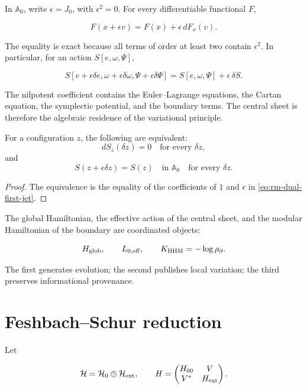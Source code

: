 In \(\mathbb A_0\), write \(\epsilon=J_0\), with \(\epsilon^2=0\). For
every differentiable functional \(F\),

\begin{equation}
\boxed{F(x+\epsilon v)=F(x)+\epsilon\,dF_x(v).}
\label{eq:rm-dual-first-jet}
\end{equation}

The equality is exact because all terms of order at least two
contain \(\epsilon^2\). In particular, for an action
\(S[e,\omega,\Psi]\),

\begin{equation}
S[e+\epsilon\delta e,\omega+\epsilon\delta\omega,
  \Psi+\epsilon\delta\Psi]
=S[e,\omega,\Psi]+\epsilon\,\delta S.
\label{eq:rm-action-first-jet}
\end{equation}

The nilpotent coefficient contains the Euler--Lagrange equations, the
Cartan equation, the symplectic potential, and the boundary terms.
The central sheet is therefore the algebraic residence of the variational
principle.

\begin{theorem}
For a configuration \(z\), the following are equivalent:
\[
dS_z(\delta z)=0\quad\text{for every }\delta z,
\]
and
\[
S(z+\epsilon\delta z)=S(z)
\quad\text{in }\mathbb A_0
\quad\text{for every }\delta z.
\]
\end{theorem}

\begin{proof}
The equivalence is the equality of the coefficients of \(1\) and \(\epsilon\) in
\eqref{eq:rm-dual-first-jet}.
\end{proof}

The global Hamiltonian, the effective action of the central sheet, and the
modular Hamiltonian of the boundary are coordinated objects:

\[
H_{\rm glob},
\qquad
L_{0,\rm eff},
\qquad
K_{\rm HHM}=-\log\rho_{\partial}.
\]

The first generates evolution; the second publishes
local variation; the third preserves informational provenance.

\section{Feshbach--Schur reduction}

Let

\[
\mathcal H=\mathcal H_0\oplus\mathcal H_{\rm ext},
\qquad
H=
\begin{pmatrix}
H_{00}&V\\ V^*&H_{\rm ext}
\end{pmatrix}.
\]

